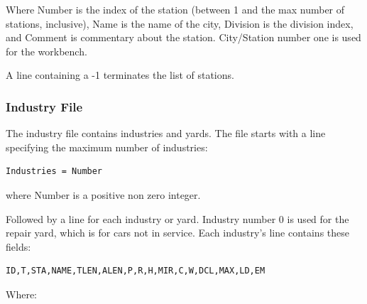 Where Number is the index of the station (between 1 and the max number
of stations, inclusive), Name is the name of the city, Division is the
division index, and Comment is commentary about the station. 
City/Station number one is used for the workbench.

A line containing a -1 terminates the list of stations.

\subsubsection{Industry File}

The industry file contains industries and yards.  The file starts with a
line specifying the maximum number of industries:

\begin{verbatim}
Industries = Number
\end{verbatim}

where Number is a positive non zero integer.

Followed by a line for each industry or yard.  Industry number 0 is
used for the repair yard, which is for cars not in service.  Each
industry's line contains these fields:

\begin{verbatim}
ID,T,STA,NAME,TLEN,ALEN,P,R,H,MIR,C,W,DCL,MAX,LD,EM
\end{verbatim}

Where:

